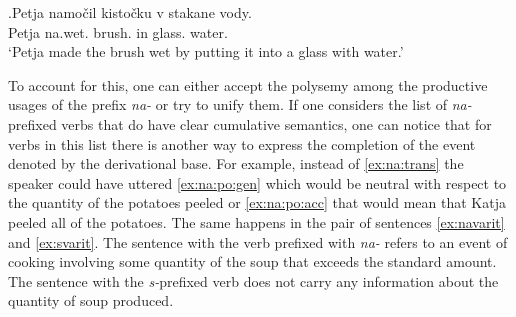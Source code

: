 \exg.\label{ex:namochit}Petja namo\v{c}il kisto\v{c}ku v stakane vody.\\
Petja na.wet. brush. in glass. water.\\
`Petja made the brush wet by putting it into a glass with water.'

%
%

To account for this, one can either accept the polysemy among the productive usages of the prefix \textit{na-} or try to unify them. If one considers the list of \textit{na-}prefixed verbs that do have clear cumulative semantics, one can notice that for verbs in this list there is another way to express the completion of the event denoted by the derivational base. For example, instead of \ref{ex:na:trans} the speaker could have uttered \ref{ex:na:po:gen} which would be neutral with respect to the quantity of the potatoes peeled or \ref{ex:na:po:acc} that would mean that Katja peeled all of the potatoes. The same happens in the pair of sentences \ref{ex:navarit} and \ref{ex:svarit}. The sentence with the verb prefixed with \textit{na-} refers to an event of cooking involving some quantity of the soup that exceeds the standard amount. The sentence with the \textit{s-}prefixed verb does not carry any information about the quantity of soup produced.

